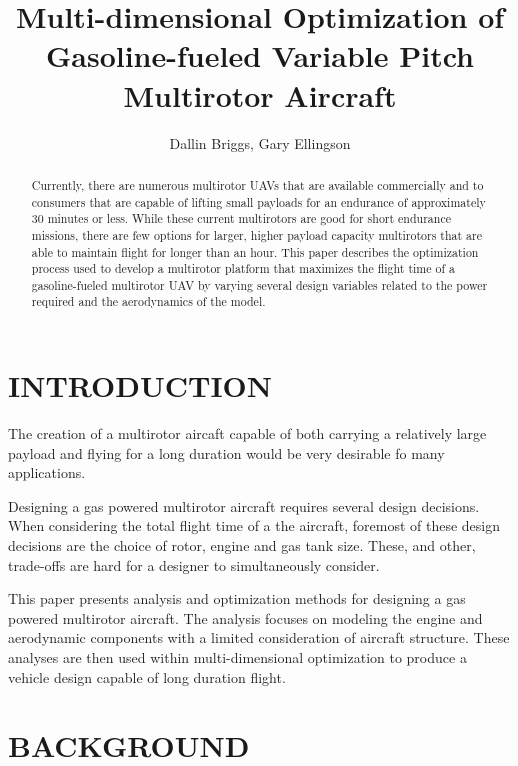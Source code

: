 \documentclass[letterpaper, 10 pt, conference]{ieeeconf}  %
\title{\LARGE \bf
Multi-dimensional Optimization of Gasoline-fueled Variable Pitch Multirotor Aircraft
}
\author{Dallin Briggs, Gary Ellingson%
}
\begin{document}
\maketitle
\thispagestyle{empty}
\pagestyle{empty}


\begin{abstract}

Currently, there are numerous multirotor UAVs that are available commercially and to consumers that are capable of lifting small payloads for an endurance of approximately 30 minutes or less. While these current multirotors are good for short endurance missions, there are few options for larger, higher payload capacity multirotors that are able to maintain flight for longer than an hour. This paper describes the optimization process used to develop a multirotor platform that maximizes the flight time of a gasoline-fueled multirotor UAV by varying several design variables related to the power required and the aerodynamics of the model.

\end{abstract}


\section{INTRODUCTION}

The creation of a multirotor aircaft capable of both carrying a relatively large payload and flying for a long duration would be very desirable fo many applications.

Designing a gas powered multirotor aircraft requires several design decisions. When considering the total flight time of a the aircraft, foremost of these design decisions are the choice of rotor, engine and gas tank size.  These, and other, trade-offs are hard for a designer to simultaneously consider. 

This paper presents analysis and optimization methods for designing a gas powered multirotor aircraft.  The analysis focuses on modeling the engine and aerodynamic components with a limited consideration of aircraft structure.  These analyses are then used within multi-dimensional optimization to produce a vehicle design capable of long duration flight. 

\section{BACKGROUND}
\end{document}
